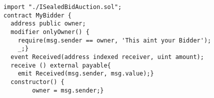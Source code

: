 \begin{lstlisting}[language=Solidity]
import "./ISealedBidAuction.sol";
contract MyBidder {
  address public owner;
  modifier onlyOwner() {
  	require(msg.sender == owner, 'This aint your Bidder');
    _;}
  event Received(address indexed receiver, uint amount);
  receive () external payable{
  	emit Received(msg.sender, msg.value);}
  constructor() {
        owner = msg.sender;}
\end{lstlisting}